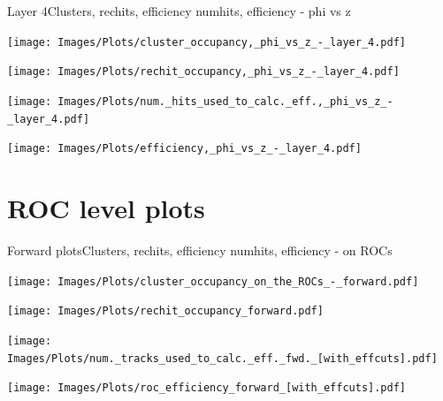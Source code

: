 \documentclass{beamer}
\begin{document}
\begin{frame}{Layer 4}{Clusters, rechits, efficiency numhits, efficiency - phi vs z}
  \hspace{0.01\textwidth}%
  \begin{minipage}{0.45\textwidth}
    \centering
    \texttt{[image: Images/Plots/cluster\_occupancy,\_phi\_vs\_z\_-\_layer\_4.pdf]}
  \end{minipage}%
  \hspace{0.01\textwidth}%
  \begin{minipage}{0.45\textwidth}
    \centering
    \texttt{[image: Images/Plots/rechit\_occupancy,\_phi\_vs\_z\_-\_layer\_4.pdf]}
  \end{minipage}
  \vspace*{0.2cm}
  \begin{minipage}{0.45\textwidth}
    \centering
    \texttt{[image: Images/Plots/num.\_hits\_used\_to\_calc.\_eff.,\_phi\_vs\_z\_-\_layer\_4.pdf]}
  \end{minipage}%
  \hspace{0.01\textwidth}%
  \begin{minipage}{0.45\textwidth}
    \centering
    \texttt{[image: Images/Plots/efficiency,\_phi\_vs\_z\_-\_layer\_4.pdf]}
  \end{minipage}
\end{frame}

\section{ROC level plots}

\begin{frame}{Forward plots}{Clusters, rechits, efficiency numhits, efficiency - on ROCs}
  \hspace{0.01\textwidth}%
  \begin{minipage}{0.45\textwidth}
    \centering
    \texttt{[image: Images/Plots/cluster\_occupancy\_on\_the\_ROCs\_-\_forward.pdf]}
  \end{minipage}%
  \hspace{0.01\textwidth}%
  \begin{minipage}{0.45\textwidth}
    \centering
    \texttt{[image: Images/Plots/rechit\_occupancy\_forward.pdf]}
  \end{minipage}
  \vspace*{0.2cm}
  \begin{minipage}{0.45\textwidth}
    \centering
    \texttt{[image: Images/Plots/num.\_tracks\_used\_to\_calc.\_eff.\_fwd.\_[with\_effcuts].pdf]}
  \end{minipage}%
  \hspace{0.01\textwidth}%
  \begin{minipage}{0.45\textwidth}
    \centering
    \texttt{[image: Images/Plots/roc\_efficiency\_forward\_[with\_effcuts].pdf]}
  \end{minipage}
\end{frame}
\end{document}
